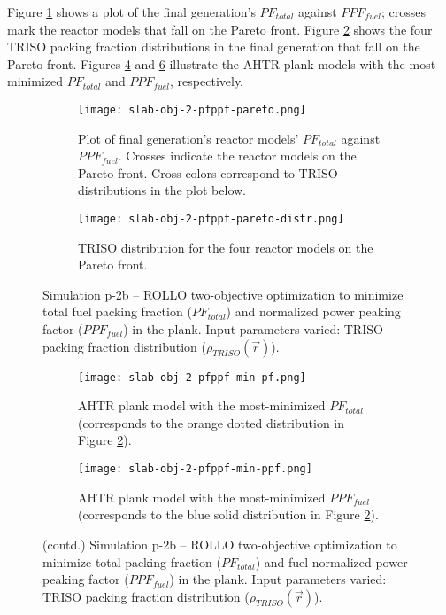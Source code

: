 Figure \ref{fig:slab-obj-2-pfppf-pareto} shows a plot of the final generation's 
$PF_{total}$ against $PPF_{fuel}$; crosses mark the reactor models that fall on 
the Pareto front.
Figure \ref{fig:slab-obj-2-pfppf-pareto-distr} shows the four TRISO packing fraction 
distributions in the final generation that fall on the Pareto front. 
Figures \ref{fig:slab-obj-2-pfppf-min-pf} and \ref{fig:slab-obj-2-pfppf-min-ppf} 
illustrate the \gls{AHTR} plank models with the most-minimized $PF_{total}$ and 
$PPF_{fuel}$, respectively. 
\begin{figure}[htbp!]
    \centering
    \begin{subfigure}{\textwidth}
        \texttt{[image: slab-obj-2-pfppf-pareto.png]}
        \caption{Plot of final generation's reactor models' $PF_{total}$ against 
        $PPF_{fuel}$. 
        Crosses indicate the reactor models on the Pareto front. Cross colors correspond  
        to TRISO distributions in the plot below.}
        \label{fig:slab-obj-2-pfppf-pareto} 
    \end{subfigure}
    \begin{subfigure}{\textwidth}
        \texttt{[image: slab-obj-2-pfppf-pareto-distr.png]}
        \caption{TRISO distribution for the four reactor models on the Pareto front.}
        \label{fig:slab-obj-2-pfppf-pareto-distr} 
    \end{subfigure}
    \caption{Simulation p-2b -- ROLLO two-objective optimization to minimize total fuel 
    packing fraction ($PF_{total}$) and normalized power peaking factor ($PPF_{fuel}$) 
    in the plank. 
    Input parameters varied: TRISO packing fraction distribution 
    ($\rho_{TRISO}(\vec{r})$).}
    \label{fig:slab-obj-2-pfppf}
\end{figure}
\begin{figure}[htbp!]
    \ContinuedFloat
    \begin{subfigure}{\textwidth}
        \texttt{[image: slab-obj-2-pfppf-min-pf.png]}
        \caption{\gls{AHTR} plank model with the most-minimized $PF_{total}$
        (corresponds to the orange dotted distribution in Figure 
        \ref{fig:slab-obj-2-pfppf-pareto-distr}).}
        \label{fig:slab-obj-2-pfppf-min-pf} 
    \end{subfigure}
    \begin{subfigure}{\textwidth}
        \texttt{[image: slab-obj-2-pfppf-min-ppf.png]}
        \caption{\gls{AHTR} plank model with the most-minimized $PPF_{fuel}$
        (corresponds to the blue solid distribution in Figure 
        \ref{fig:slab-obj-2-pfppf-pareto-distr}).}
        \label{fig:slab-obj-2-pfppf-min-ppf} 
    \end{subfigure}
    \caption{(contd.) Simulation p-2b -- ROLLO two-objective optimization to minimize 
    total packing fraction ($PF_{total}$) and fuel-normalized power peaking factor 
    ($PPF_{fuel}$) in the plank. 
    Input parameters varied: TRISO packing fraction distribution ($\rho_{TRISO}(\vec{r})$).}
\end{figure}

